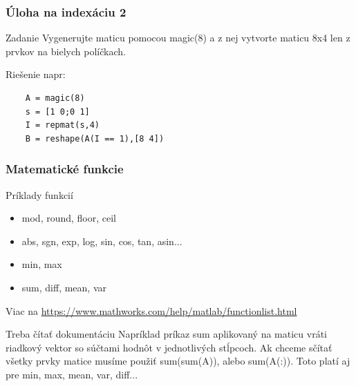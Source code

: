 \documentclass{beamer}
\begin{document}
\begin{frame}[fragile]
\frametitle{Úloha na indexáciu 2}
 
  \begin{block}{Zadanie}
    Vygenerujte maticu pomocou magic(8) a z nej vytvorte maticu 8x4 len z prvkov na bielych políčkach.
  \end{block}
  
  \noindent{}  
  
  \pause
  
  \begin{block}{Riešenie napr:}
  \begin{verbatim}
    A = magic(8)
    s = [1 0;0 1]
    I = repmat(s,4)
    B = reshape(A(I == 1),[8 4]) \end{verbatim}
  \end{block}  
\end{frame}

\begin{frame}
\frametitle{Matematické funkcie}
 
  \begin{block}{Príklady funkcií}
    \begin{itemize}
      \item mod, round, floor, ceil
      \item abs, sgn, exp, log, sin, cos, tan, asin...
      \item min, max
      \item sum, diff, mean, var
    \end{itemize}
  \end{block}
 
  Viac na \url{https://www.mathworks.com/help/matlab/functionlist.html}
  
  \begin{alertblock}{Treba čítať dokumentáciu}
    Napríklad príkaz sum aplikovaný na maticu vráti riadkový vektor so súčtami hodnôt v jednotlivých stĺpcoch. Ak chceme sčítať všetky prvky matice musíme použiť sum(sum(A)), alebo sum(A(:)). Toto platí aj pre min, max, mean, var, diff...
  \end{alertblock}  
\end{frame}
\end{document}
